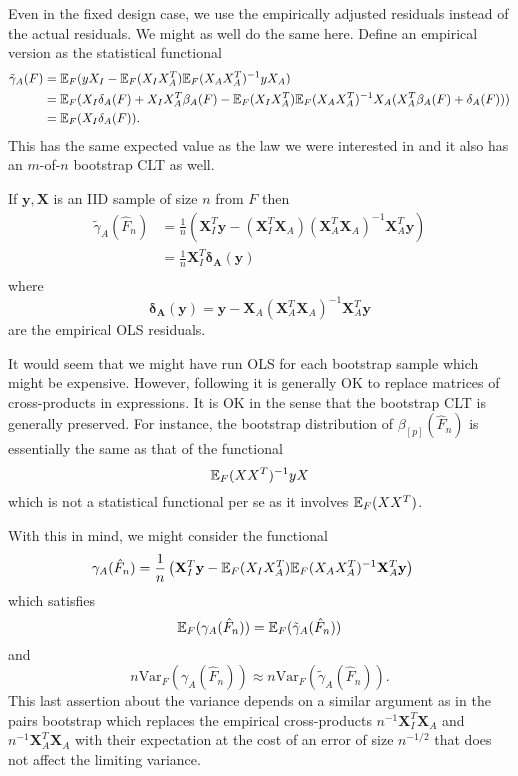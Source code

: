 \documentclass{article}
\begin{document}
Even in the fixed design case, we use the empirically adjusted residuals
instead of the actual residuals. We might as well do the same here.
Define an empirical version as the statistical functional
$$
\begin{aligned}
\tilde{\gamma}_{A}(F) &= \mathbb{E}_F(yX_I - \mathbb{E}_F(X_I X_A^T) \mathbb{E}_F(X_AX_A^T)^{-1} yX_A) \\
&= \mathbb{E}_F(X_I \delta_A(F) + X_IX_A^T\beta_A(F) - \mathbb{E}_F(X_I X_A^T) \mathbb{E}_F(X_AX_A^T)^{-1} X_A(X_A^T\beta_A(F) + \delta_A(F))) \\
&= \mathbb{E}_F(X_I \delta_A(F)).
\end{aligned}
$$
This has the same expected value as 
the law we were interested in and it also has an $m$-of-$n$ bootstrap CLT as well.

If $\mathbf{y}, \mathbf{X}$ is an IID sample of size $n$ from $F$ then
$$
\begin{aligned}
\tilde{\gamma}_A(\hat{F}_n) &= \frac{1}{n} \left(\mathbf{X}_I^T\mathbf{y} - \left(\mathbf{X}_I^T\mathbf{X}_A \right) \left(\mathbf{X}_A^T\mathbf{X}_A \right)^{-1} \mathbf{X}_A^T\mathbf{y} \right) \\
 &= \frac{1}{n}\mathbf{X}_I^T\mathbf{\delta_A(y)} \\
\end{aligned}
$$
where
$$
\mathbf{\delta_A(y)} = \mathbf{y} - \mathbf{X}_A \left(\mathbf{X}_A^T\mathbf{X}_A \right)^{-1} \mathbf{X}_A^T\mathbf{y}
$$
are the empirical OLS residuals. 

It would seem that we might have
run OLS for each bootstrap sample which might be expensive. 
However, following \cite{penn_pairs} it is generally OK to replace
matrices of cross-products in expressions. It is OK in the sense
that the bootstrap CLT is generally preserved. For instance, the
bootstrap distribution of $\beta_{[p]}(\hat{F}_n)$ is essentially the same as
that of the functional
$$
\mathbb{E}_F(XX^T)^{-1} yX
$$
which is not a statistical functional per se as it involves $\mathbb{E}_F(XX^T)$.

With this in mind, we might consider the functional 
$$
\begin{aligned}
\gamma_A(\hat{F}_n) &= \frac{1}{n} \left(\mathbf{X}_I^T\mathbf{y} - \mathbb{E}_F(X_IX_A^T) \mathbb{E}_F(X_AX_A^T)^{-1} \mathbf{X}_A^T\mathbf{y} \right)
\end{aligned}
$$
which satisfies
$$
\mathbb{E}_F(\gamma_A(\hat{F}_n)) = \mathbb{E}_F(\tilde{\gamma}_A(\hat{F}_n))
$$
and
$$
n\text{Var}_F(\gamma_A(\hat{F}_n)) \approx n \text{Var}_F(\tilde{\gamma}_A(\hat{F}_n)).
$$
This last assertion about the variance depends on a similar argument
as in the pairs bootstrap which replaces the empirical cross-products
$n^{-1}\mathbf{X}_I^T\mathbf{X}_A$ and $n^{-1}\mathbf{X}_A^T\mathbf{X}_A$
with their expectation at the cost of an error of size $n^{-1/2}$ that does not affect the limiting variance.
\end{document}
